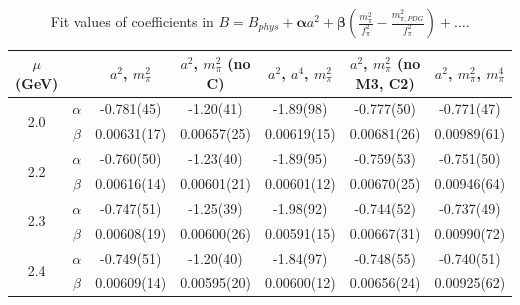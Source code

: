\documentclass[12pt]{extarticle}
\begin{document}
\begin{table}[h!]
\begin{center}
\begin{tabular}{|c c|c|c|c|c|c|}
\hline
$\mu$ (GeV) &  & $a^2$, $m_\pi^2$& $a^2$, $m_\pi^2$ (no C)& $a^2$, $a^4$, $m_\pi^2$& $a^2$, $m_\pi^2$ (no M3, C2)& $a^2$, $m_\pi^2$, $m_\pi^4$\\
\hline
\multirow{2}{0.5in}{2.0} & $\alpha$ & -0.781(45)& -1.20(41)& -1.89(98)& -0.777(50)& -0.771(47)\\
 & $\beta$ & 0.00631(17)& 0.00657(25)& 0.00619(15)& 0.00681(26)& 0.00989(61)\\
\hline
\multirow{2}{0.5in}{2.2} & $\alpha$ & -0.760(50)& -1.23(40)& -1.89(95)& -0.759(53)& -0.751(50)\\
 & $\beta$ & 0.00616(14)& 0.00601(21)& 0.00601(12)& 0.00670(25)& 0.00946(64)\\
\hline
\multirow{2}{0.5in}{2.3} & $\alpha$ & -0.747(51)& -1.25(39)& -1.98(92)& -0.744(52)& -0.737(49)\\
 & $\beta$ & 0.00608(19)& 0.00600(26)& 0.00591(15)& 0.00667(31)& 0.00990(72)\\
\hline
\multirow{2}{0.5in}{2.4} & $\alpha$ & -0.749(51)& -1.20(40)& -1.84(97)& -0.748(55)& -0.740(51)\\
 & $\beta$ & 0.00609(14)& 0.00595(20)& 0.00600(12)& 0.00656(24)& 0.00925(62)\\
\hline
\end{tabular}
\caption{Fit values of coefficients in $B = B_{phys} + \mathbf{\alpha} a^2 + \mathbf{\beta}\left(\frac{m_\pi^2}{f_\pi^2}-\frac{m_{\pi,PDG}^2}{f_\pi^2}\right) + \ldots$.}
\end{center}
\end{table}




















\clearpage
\end{document}
